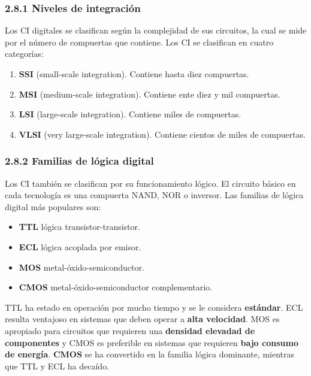 \subsubsection*{2.8.1 Niveles de integraci\'{o}n} Los CI digitales se
clasifican seg\'{u}n la complejidad de sus circuitos, la cual se mide por el
n\'{u}mero de compuertas que contiene. Los CI se clasifican en cuatro
categor\'{i}as:

\begin{enumerate} \item \textbf{SSI} (small-scale integration). Contiene hasta
          diez compuertas. \item \textbf{MSI} (medium-scale integration). Contiene ente
          diez y mil compuertas. \item \textbf{LSI} (large-scale integration). Contiene
          miles de compuertas. \item \textbf{VLSI} (very large-scale integration).
          Contiene cientos de miles de compuertas. \end{enumerate}

\subsubsection*{2.8.2 Familias de l\'{o}gica digital} Los CI tambi\'{e}n se
clasifican por su funcionamiento l\'{o}gico. El circuito b\'{a}sico en cada
tecnolog\'{i}a es una compuerta NAND, NOR o inversor. Las familias de l\'{o}gica
digital m\'{a}s populares son:

\begin{itemize} \item \textbf{TTL} l\'{o}gica transistor-transistor. \item
          \textbf{ECL} l\'{o}gica acoplada por emisor. \item \textbf{MOS}
          metal-\'{o}xido-semiconductor. \item \textbf{CMOS} metal-\'{o}xido-semiconductor
          complementario. \end{itemize}

TTL ha estado en operaci\'{o}n por mucho tiempo y se le considera
\textbf{est\'{a}ndar}. ECL resulta ventajoso en sistemas que deben operar a
\textbf{alta velocidad}. MOS es apropiado para circuitos que requieren una
\textbf{densidad elevadad de componentes} y CMOS es preferible en sistemas que
requieren \textbf{bajo consumo de energ\'{i}a}. \textbf{CMOS} se ha convertido
en la familia l\'{o}gica dominante, mientras que TTL y ECL ha deca\'{i}do.

